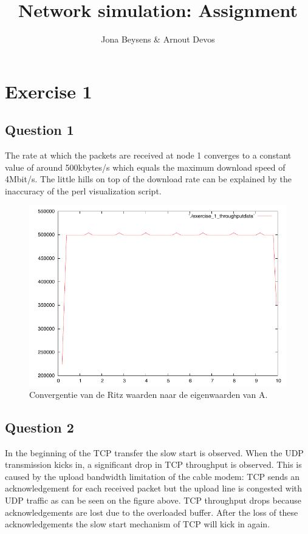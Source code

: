 \documentclass[a4paper]{report}
\title{Network simulation: Assignment}
\author{Jona Beysens \& Arnout Devos}
\newcommand{\opgave}[1]{\section{Question #1}}
\begin{document}
\maketitle
\setcounter{chapter}{1}
\chapter*{Exercise 1}
\opgave{1}
The rate at which the packets are received at node 1 converges to a constant value of around 500kbytes/s which equals the maximum download speed of 4Mbit/s. The little hills on top of the download rate can be explained by the inaccuracy of the perl visualization script.

\begin{figure}[htb]
\centerline{\includegraphics{Exercise1/Question1/exercise_1plot.pdf}}
\caption{Convergentie van de Ritz waarden naar de eigenwaarden van A.}
\label{fig:figure1}
\end{figure}

\opgave{2}
In the beginning of the TCP transfer the slow start is observed. When the UDP transmission kicks in, a significant drop in TCP throughput is observed. This is caused by the upload bandwidth limitation of the cable modem: TCP sends an acknowledgement for each received packet but the upload line is congested with UDP traffic as can be seen on the figure above. TCP throughput drops because acknowledgements are lost due to the overloaded buffer. After the loss of these acknowledgements the slow start mechanism of TCP will kick in again. 
\end{document}
